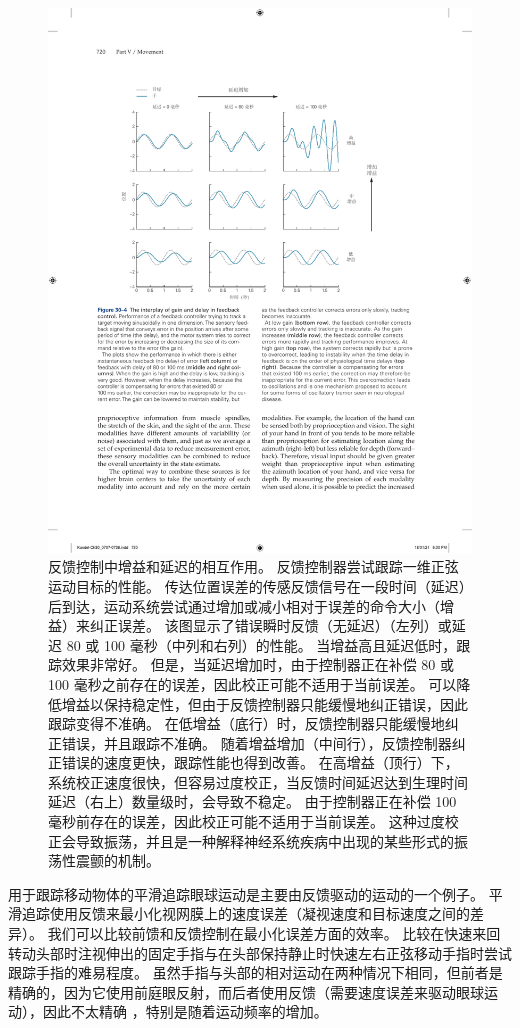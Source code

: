 \begin{figure}[htbp]
	\centering
	\includegraphics[width=0.9\linewidth]{chap30/fig_30_4}
	\caption{反馈控制中增益和延迟的相互作用。
		反馈控制器尝试跟踪一维正弦运动目标的性能。
		传达位置误差的传感反馈信号在一段时间（延迟）后到达，运动系统尝试通过增加或减小相对于误差的命令大小（增益）来纠正误差。
		该图显示了错误瞬时反馈（无延迟）（左列）或延迟 80 或 100 毫秒（中列和右列）的性能。
		当增益高且延迟低时，跟踪效果非常好。
		但是，当延迟增加时，由于控制器正在补偿 80 或 100 毫秒之前存在的误差，因此校正可能不适用于当前误差。
		可以降低增益以保持稳定性，但由于反馈控制器只能缓慢地纠正错误，因此跟踪变得不准确。
		在低增益（底行）时，反馈控制器只能缓慢地纠正错误，并且跟踪不准确。
		随着增益增加（中间行），反馈控制器纠正错误的速度更快，跟踪性能也得到改善。
		在高增益（顶行）下，系统校正速度很快，但容易过度校正，当反馈时间延迟达到生理时间延迟（右上）数量级时，会导致不稳定。
		由于控制器正在补偿 100 毫秒前存在的误差，因此校正可能不适用于当前误差。
		这种过度校正会导致振荡，并且是一种解释神经系统疾病中出现的某些形式的振荡性震颤的机制。}
	\label{fig:30_4}
\end{figure}


用于跟踪移动物体的平滑追踪眼球运动是主要由反馈驱动的运动的一个例子。
平滑追踪使用反馈来最小化视网膜上的速度误差（凝视速度和目标速度之间的差异）。
我们可以比较前馈和反馈控制在最小化误差方面的效率。
比较在快速来回转动头部时注视伸出的固定手指与在头部保持静止时快速左右正弦移动手指时尝试跟踪手指的难易程度。
虽然手指与头部的相对运动在两种情况下相同，但前者是精确的，因为它使用前庭眼反射，而后者使用反馈（需要速度误差来驱动眼球运动），因此不太精确 ，特别是随着运动频率的增加。


